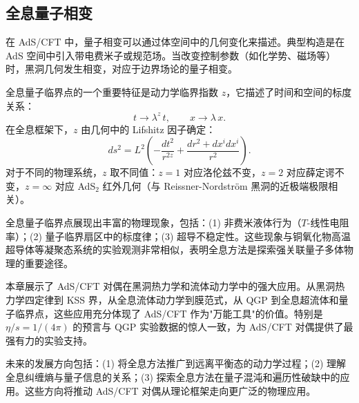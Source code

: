 \subsection{全息量子相变}

\begin{definition}[全息量子临界点]\label{def:holo-QCP}
在 AdS/CFT 中，量子相变可以通过体空间中的几何变化来描述。典型构造是在 AdS 空间中引入带电费米子或规范场。当改变控制参数（如化学势、磁场等）时，黑洞几何发生相变，对应于边界场论的量子相变。
\end{definition}

\begin{property}[动力学临界指数]\label{prop:dynamical-exp}
全息量子临界点的一个重要特征是动力学临界指数 $z$，它描述了时间和空间的标度关系：
\begin{equation}
    t \to \lambda^z\,t, \qquad x \to \lambda\,x.
\end{equation}
在全息框架下，$z$ 由几何中的 Lifshitz 因子确定：
\begin{equation}
    ds^2 = L^2\left(-\frac{dt^2}{r^{2z}} + \frac{dr^2 + dx^i dx^i}{r^2}\right).
\end{equation}
对于不同的物理系统，$z$ 取不同值：$z = 1$ 对应洛伦兹不变，$z = 2$ 对应薛定谔不变，$z = \infty$ 对应 AdS$_2$ 红外几何（与 Reissner-Nordstr\"om 黑洞的近极端极限相关）。
\end{property}

\begin{remark}[全息量子临界点的普适性]
全息量子临界点展现出丰富的物理现象，包括：(1) 非费米液体行为（$T$-线性电阻率）；(2) 量子临界扇区中的标度律；(3) 超导不稳定性。这些现象与铜氧化物高温超导体等凝聚态系统的实验观测非常相似，表明全息方法是探索强关联量子多体物理的重要途径。
\end{remark}

\begin{note}[总结与展望]
本章展示了 AdS/CFT 对偶在黑洞热力学和流体动力学中的强大应用。从黑洞热力学四定律到 KSS 界，从全息流体动力学到膜范式，从 QGP 到全息超流体和量子临界点，这些应用充分体现了 AdS/CFT 作为"万能工具"的价值。特别是 $\eta/s = 1/(4\pi)$ 的预言与 QGP 实验数据的惊人一致，为 AdS/CFT 对偶提供了最强有力的实验支持。

未来的发展方向包括：(1) 将全息方法推广到远离平衡态的动力学过程；(2) 理解全息纠缠熵与量子信息的关系；(3) 探索全息方法在量子混沌和遍历性破缺中的应用。这些方向将推动 AdS/CFT 对偶从理论框架走向更广泛的物理应用。
\end{note}

